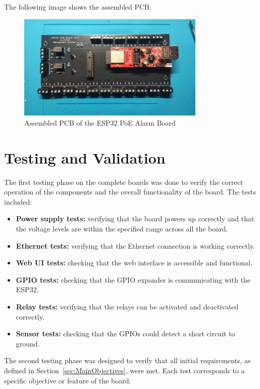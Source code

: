 \documentclass[a4paper,12pt]{article}
\begin{document}
The following image shows the assembled PCB:
\begin{figure}[H]
    \centering
    \includegraphics[width=0.8\textwidth]{Media/PCB_Assembly.jpg}
    \caption{Assembled PCB of the ESP32 PoE Alarm Board}
    \label{fig:assembled_pcb}
\end{figure}

\newpage
\section{Testing and Validation}

The first testing phase on the complete boards was done to verify the correct operation of the components and the overall functionality of the board. The tests included:

\begin{itemize}
    \item \textbf{Power supply tests:} verifying that the board powers up correctly and that the voltage levels are within the specified range across all the board.
    \item \textbf{Ethernet tests:} verifying that the Ethernet connection is working correctly.
    \item \textbf{Web UI tests:} checking that the web interface is accessible and functional.
    \item \textbf{GPIO tests:} checking that the GPIO expander is communicating with the ESP32.
    \item \textbf{Relay tests:} verifying that the relays can be activated and deactivated correctly.
    \item \textbf{Sensor tests:} checking that the GPIOs could detect a short circuit to ground.
\end{itemize}

The second testing phase was designed to verify that all initial requirements, as defined in Section~\ref{sec:MainObjectives}, were met. Each test corresponds to a specific objective or feature of the board:
\end{document}
